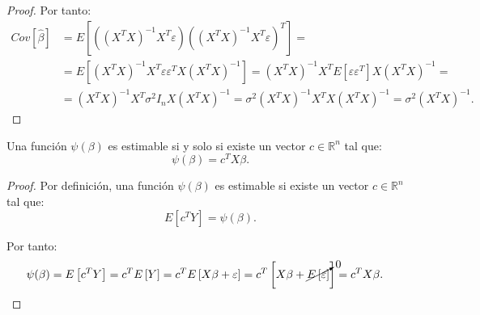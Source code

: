 \begin{prop}
\begin{proof}
        Por tanto:
        \begin{align*}
            Cov\left[\hat{\beta}\right] &= E\left[\left((X^TX)^{-1}X^T\varepsilon\right)\left((X^TX)^{-1}X^T\varepsilon\right)^T\right] =\\
            &= E\left[(X^TX)^{-1}X^T\varepsilon \varepsilon^TX(X^TX)^{-1}\right] = (X^TX)^{-1}X^TE\left[\varepsilon \varepsilon^T\right]X(X^TX)^{-1} =\\
            &= (X^TX)^{-1}X^T\sigma^2 I_n X(X^TX)^{-1} = \sigma^2 (X^TX)^{-1}X^TX(X^TX)^{-1} = \sigma^2 (X^TX)^{-1}.
        \end{align*}
    \end{proof}
\end{prop}

\begin{prop}
    Una función $\psi(\beta)$ es estimable si y solo si existe un vector $c \in \mathbb{R}^n$ tal que:
    \begin{equation*}
        \psi(\beta) = c^TX\beta.
    \end{equation*}
    \begin{proof}
        Por definición, una función $\psi(\beta)$ es estimable si existe un vector $c \in \mathbb{R}^n$ tal que:
        \begin{equation*}
            E\left[c^TY\right] = \psi(\beta).
        \end{equation*}

        Por tanto:
        \begin{align*}
            \psi(\beta) &= E\left[c^TY\right] = c^TE\left[Y\right] = c^TE\left[X\beta + \varepsilon\right] = c^T\left[X\beta + \cancelto{0}{E\left[\varepsilon\right]}\right] = c^TX\beta.
        \end{align*}
    \end{proof}
\end{prop}